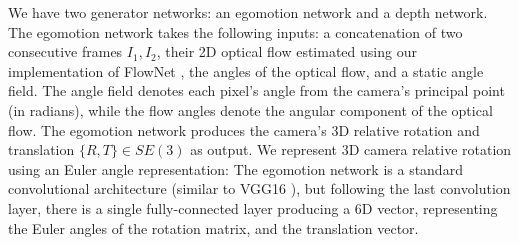 \documentclass[10pt,twocolumn,letterpaper]{article}
\newcommand\todo[1]{\textcolor{red}{#1}}
\begin{document}
\begin{bibunit}[ieee]
We have two generator networks: an egomotion network and a depth network. The egomotion network takes the following inputs: a concatenation of two consecutive frames $I_1,I_2$, their 2D optical flow estimated using our implementation of FlowNet \cite{flownet}, the angles of the optical flow, and a static angle field. The angle field denotes each pixel's angle from the camera's principal point (in radians), while the flow angles denote the angular component of the optical flow. The egomotion network produces the camera's 3D relative rotation and translation  $\{ R , T \} \in SE(3)$ as output. We represent 3D camera relative rotation using an Euler angle representation:%
The egomotion network is a standard convolutional architecture (similar to VGG16 \cite{simonyan2014very}), but following the last convolution layer, there is a single fully-connected layer producing a 6D vector, representing the Euler angles of the rotation matrix, and the translation vector. %


\end{bibunit}
\end{document}
